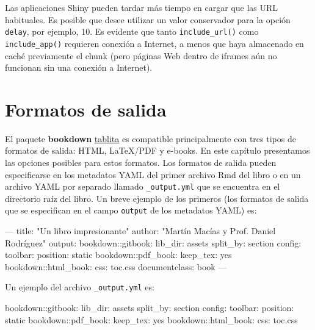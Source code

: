 \documentclass[12pt,]{krantz}
\makeatletter
\newenvironment{Shaded}{\begin{snugshade}}{\end{snugshade}}
\newcommand{\StringTok}[1]{\textcolor[rgb]{0.31,0.60,0.02}{{#1}}}
\newcommand{\OtherTok}[1]{\textcolor[rgb]{0.56,0.35,0.01}{{#1}}}
\newcommand{\FunctionTok}[1]{\textcolor[rgb]{0.00,0.00,0.00}{{#1}}}
\newcommand{\NormalTok}[1]{{#1}}
\newenvironment{kframe}{%
\medskip{}
\setlength{\fboxsep}{.8em}
 \def\at@end@of@kframe{}%
 \ifinner\ifhmode%
  \def\at@end@of@kframe{\end{minipage}}%
  \begin{minipage}{\columnwidth}%
 \fi\fi%
 \def\FrameCommand##1{\hskip\@totalleftmargin \hskip-\fboxsep
 \colorbox{shadecolor}{##1}\hskip-\fboxsep
     \hskip-\linewidth \hskip-\@totalleftmargin \hskip\columnwidth}%
 \MakeFramed {\advance\hsize-\width
   \@totalleftmargin\z@ \linewidth\hsize
   \@setminipage}}%
 {\par\unskip\endMakeFramed%
 \at@end@of@kframe}
\renewenvironment{Shaded}{\begin{kframe}}{\end{kframe}}
\theoremstyle{definition}
\theoremstyle{definition}
\theoremstyle{remark}
\makeatother
\begin{document}
Las aplicaciones Shiny pueden tardar más tiempo en cargar que las URL
habituales. Es posible que desee utilizar un valor conservador para la
opción \texttt{delay}, por ejemplo, 10. Es evidente que tanto
\texttt{include\_url()} como \texttt{include\_app()} requieren conexión
a Internet, a menos que haya almacenado en caché previamente el chunk
(pero páginas Web dentro de iframes aún no funcionan sin una conexión a
Internet).

\chapter{Formatos de salida}\label{formatos-de-salida}

El paquete \textbf{bookdown} \protect\hyperlink{tablas}{tablita} es
compatible principalmente con tres tipos de formatos de salida: HTML,
LaTeX/PDF y e-books. En este capítulo presentamos las opciones posibles
para estos formatos. Los formatos de salida pueden especificarse en los
metadatos YAML del primer archivo Rmd del libro o en un archivo YAML por
separado llamado \texttt{\_output.yml} que se encuentra en el directorio
raíz del libro. Un breve ejemplo de los primeros (los formatos de salida
que se especifican en el campo \texttt{output} de los metadatos YAML)
es:

\begin{Shaded}
\begin{Highlighting}[]
\OtherTok{---}
\FunctionTok{title:} \StringTok{"Un libro impresionante"}
\FunctionTok{author:} \StringTok{"Martín Macías y Prof. Daniel Rodríguez"}
\FunctionTok{output:}
  \FunctionTok{bookdown:}\NormalTok{:gitbook:}
    \FunctionTok{lib_dir:} \NormalTok{assets}
    \FunctionTok{split_by:} \NormalTok{section}
    \FunctionTok{config:}
      \FunctionTok{toolbar:}
        \FunctionTok{position:} \NormalTok{static}
  \FunctionTok{bookdown:}\NormalTok{:pdf_book:}
    \FunctionTok{keep_tex:} \NormalTok{yes}
  \FunctionTok{bookdown:}\NormalTok{:html_book:}
    \FunctionTok{css:} \NormalTok{toc.css}
\FunctionTok{documentclass:} \NormalTok{book}
\OtherTok{---}
\end{Highlighting}
\end{Shaded}

Un ejemplo del archivo \texttt{\_output.yml} es:

\begin{Shaded}
\begin{Highlighting}[]
\FunctionTok{bookdown:}\NormalTok{:gitbook:}
  \FunctionTok{lib_dir:} \NormalTok{assets}
  \FunctionTok{split_by:} \NormalTok{section}
  \FunctionTok{config:}
    \FunctionTok{toolbar:}
      \FunctionTok{position:} \NormalTok{static}
\FunctionTok{bookdown:}\NormalTok{:pdf_book:}
  \FunctionTok{keep_tex:} \NormalTok{yes}
\FunctionTok{bookdown:}\NormalTok{:html_book:}
  \FunctionTok{css:} \NormalTok{toc.css}
\end{Highlighting}
\end{Shaded}
\end{document}

